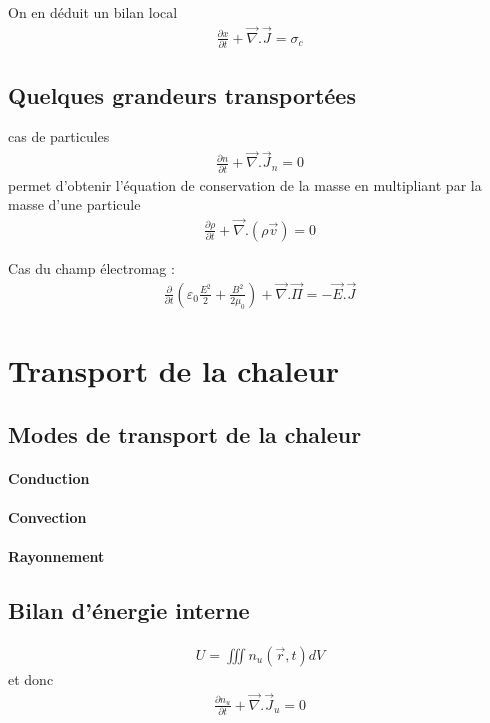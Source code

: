 \documentclass[12pt,prb,aps,epsf]{article}
\begin{document}
On en déduit un bilan local
\begin{eqnarray}
\frac{\partial x}{\partial t} + \vec{\nabla}. \vec{J} = \sigma_c
\end{eqnarray}

\subsection{Quelques grandeurs transportées}
cas de particules  
\begin{eqnarray}
	\frac{\partial n}{\partial t} + \vec{\nabla}. \vec{J}_n = 0
\end{eqnarray}
permet d'obtenir l'équation de conservation de la masse en multipliant par la masse d'une particule
\begin{eqnarray}
\frac{\partial \rho}{\partial t} + \vec{\nabla}.(\rho\vec{v}) = 0
\end{eqnarray}

Cas du champ électromag :
\begin{eqnarray}
\frac{\partial}{\partial t}\left(\varepsilon_0\frac{E^2}{2} + \frac{B^2}{2\mu_0}\right) + \vec{\nabla}.\vec{\Pi} = -\vec{E}.\vec{J}
\end{eqnarray}
\section{Transport de la chaleur}
\subsection{Modes de transport de la chaleur}
\paragraph{Conduction}
\paragraph{Convection}
\paragraph{Rayonnement}

\subsection{Bilan d'énergie interne}
\begin{eqnarray}
U = \iiint n_u(\vec{r},t)dV
\end{eqnarray}
et donc 
\begin{eqnarray}
\frac{\partial n_u}{\partial t} + \vec{\nabla}. \vec{J}_u = 0
\end{eqnarray}
\end{document}

